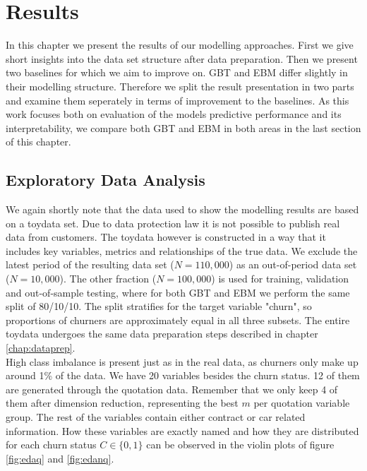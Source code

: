 \documentclass[12pt,titlepage]{article}
\begin{document}
\section{Results} \par

In this chapter we present the results of our modelling approaches. First we give short insights into the data set structure after data preparation. Then we present two baselines for which we aim to improve on. GBT and EBM differ slightly in their modelling structure. Therefore we split the result presentation in two parts and examine them seperately in terms of improvement to the baselines. As this work focuses both on evaluation of the models predictive performance and its interpretability, we compare both GBT and EBM in both areas in the last section of this chapter. \\

\subsection{Exploratory Data Analysis} \par

We again shortly note that the data used to show the modelling results are based on a toydata set. Due to data protection law it is not possible to publish real data from customers. The toydata however is constructed in a way that it includes key variables, metrics and relationships of the true data. We exclude the latest period of the resulting data set ($N=110,000$) as an out-of-period data set ($N=10,000$). The other fraction ($N=100,000$) is used for training, validation and out-of-sample testing, where for both GBT and EBM we perform the same split of 80/10/10. The split stratifies for the target variable "churn", so proportions of churners are approximately equal in all three subsets. The entire toydata undergoes the same data preparation steps described in chapter \ref{chap:dataprep}. \\
High class imbalance is present just as in the real data, as churners only make up around 1\% of the data. We have 20 variables besides the churn status. 12 of them are generated through the quotation data. Remember that we only keep 4 of them after dimension reduction, representing the best $m$ per quotation variable group. The rest of the variables contain either contract or car related information. How these variables are exactly named and how they are distributed for each churn status $C\in \{0,1\}$ can be observed in the violin plots of figure \ref{fig:edaq} and \ref{fig:edanq}. \\
\noindent
\end{document}
